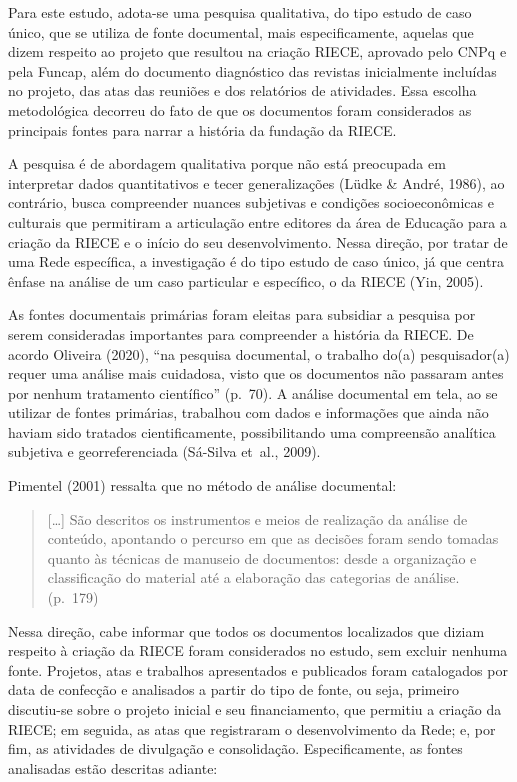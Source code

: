 \documentclass[
  a4paper,
]{book}
\begin{document}
Para este estudo, adota-se uma pesquisa qualitativa, do tipo estudo de
caso único, que se utiliza de fonte documental, mais especificamente,
aquelas que dizem respeito ao projeto que resultou na criação RIECE,
aprovado pelo CNPq e pela Funcap, além do documento diagnóstico das
revistas inicialmente incluídas no projeto, das atas das reuniões e dos
relatórios de atividades. Essa escolha metodológica decorreu do fato de
que os documentos foram considerados as principais fontes para narrar a
história da fundação da RIECE.

A pesquisa é de abordagem qualitativa porque não está preocupada em
interpretar dados quantitativos e tecer generalizações (Lüdke \& André,
1986), ao contrário, busca compreender nuances subjetivas e condições
socioeconômicas e culturais que permitiram a articulação entre editores
da área de Educação para a criação da RIECE e o início do seu
desenvolvimento. Nessa direção, por tratar de uma Rede específica, a
investigação é do tipo estudo de caso único, já que centra ênfase na
análise de um caso particular e específico, o da RIECE (Yin, 2005).

As fontes documentais primárias foram eleitas para subsidiar a pesquisa
por serem consideradas importantes para compreender a história da RIECE.
De acordo Oliveira (2020), ``na pesquisa documental, o trabalho do(a)
pesquisador(a) requer uma análise mais cuidadosa, visto que os
documentos não passaram antes por nenhum tratamento científico''
(p.~70). A análise documental em tela, ao se utilizar de fontes
primárias, trabalhou com dados e informações que ainda não haviam sido
tratados cientificamente, possibilitando uma compreensão analítica
subjetiva e georreferenciada (Sá-Silva et~al., 2009).

Pimentel (2001) ressalta que no método de análise documental:

\begin{quote}
{[}\ldots{]} São descritos os instrumentos e meios de realização da
análise de conteúdo, apontando o percurso em que as decisões foram sendo
tomadas quanto às técnicas de manuseio de documentos: desde a
organização e classificação do material até a elaboração das categorias
de análise. (p.~179)
\end{quote}

Nessa direção, cabe informar que todos os documentos localizados que
diziam respeito à criação da RIECE foram considerados no estudo, sem
excluir nenhuma fonte. Projetos, atas e trabalhos apresentados e
publicados foram catalogados por data de confecção e analisados a partir
do tipo de fonte, ou seja, primeiro discutiu-se sobre o projeto inicial
e seu financiamento, que permitiu a criação da RIECE; em seguida, as
atas que registraram o desenvolvimento da Rede; e, por fim, as
atividades de divulgação e consolidação. Especificamente, as fontes
analisadas estão descritas adiante:
\end{document}

